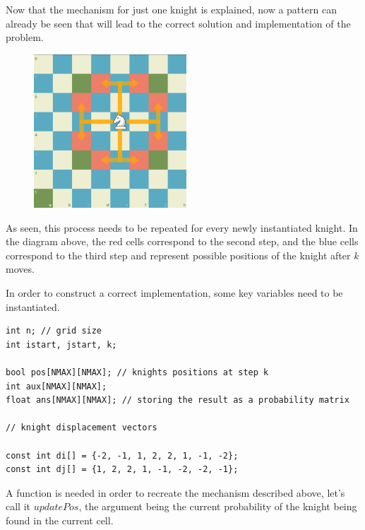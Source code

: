 \documentclass[letterpaper]{article}
\begin{document}
Now that the mechanism for just one knight is explained, now a pattern can already be seen that will lead to the correct solution and implementation of the problem.

\begin{figure} [h!]
\centering
\includegraphics[width=0.51\textwidth]{pngOfDiagrams/knightfour.png}
\end{figure}

As seen, this process needs to be repeated for every newly instantiated knight. In the diagram above, the red cells correspond to the second step, and the blue cells correspond to the third step and represent possible positions of the knight after $k$ moves. 

In order to construct a correct implementation, some key variables need to be instantiated.

\begin{lstlisting}
int n; // grid size
int istart, jstart, k;

bool pos[NMAX][NMAX]; // knights positions at step k 
int aux[NMAX][NMAX];
float ans[NMAX][NMAX]; // storing the result as a probability matrix 

// knight displacement vectors 

const int di[] = {-2, -1, 1, 2, 2, 1, -1, -2};
const int dj[] = {1, 2, 2, 1, -1, -2, -2, -1};
\end{lstlisting}

A function is needed in order to recreate the mechanism described above, let's call it $updatePos$, the argument being the current probability of the knight being found in the current cell.
\end{document}
